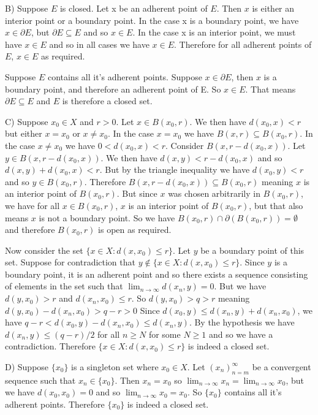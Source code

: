 \documentclass[12pt]{article}
\begin{document}
B) Suppose $E$ is closed. Let x be an adherent point of $E$. Then $x$ is either an interior point or a boundary point. In the case x is a boundary point, we have $x\in \partial E$, but $\partial E\subseteq E$ and so $x\in E$. In the case x is an interior point, we must have $x\in E$ and so in all cases we have $x\in E$. Therefore for all adherent points of $E$, $x\in E$ as required. 

Suppose $E$ contains all it's adherent points. Suppose $x\in \partial E$, then $x$ is a boundary point, and therefore an adherent point of E. So $x\in E$. That means $\partial E \subseteq E$ and $E$ is therefore a closed set.

C) Suppose $x_0\in X$ and $r>0$. Let $x \in B(x_0,r)$. We then have $d(x_0, x) <r$ but either $x=x_0$ or $x\neq x_0$. In the case $x= x_0$ we have $ B(x,r) \subseteq B(x_0,r)$. In the case $x\neq x_0$ we have $0<d(x_0,x)<r$. Consider $B(x, r-d(x_0,x))$. Let $y\in B(x, r-d(x_0,x))$. We then have $ d(x,y) <r-d(x_0,x)$ and so $d(x,y)+d(x_0,x) <r$. But by the triangle inequality we have $d(x_0,y) <r$ and so $y\in B(x_0,r)$. Therefore $ B(x, r-d(x_0,x))\subseteq B(x_0,r)$ meaning $x$ is an interior point of $B(x_0,r)$. But since $x$ was chosen arbitrarily in $ B(x_0,r)$, we have for all $x\in B(x_0,r) $, $x$ is an interior point of $B(x_0,r)$, but that also means $x$ is not a boundary point. So we have $B(x_0,r) \cap \partial(B(x_0,r)) = \emptyset$ and therefore $B(x_0,r)$ is open as required.

Now consider the set $\{x\in X: d(x,x_0)\leq r\}$. Let $y$ be a boundary point of this set. Suppose for contradiction that $y\notin \{x\in X: d(x,x_0)\leq r\}$. Since $y$ is a boundary point, it is an adherent point and so there exists a sequence consisting of elements in the set such that $\lim_{n\to\infty}d(x_n,y) = 0$. But we have $d(y,x_0)>r$ and $d(x_n,x_0) \leq r$. So $d(y,x_0) >q> r$ meaning $d(y,x_0) - d(x_n,x_0) >q-r > 0$ Since $d(x_0,y)\leq d(x_n,y) + d(x_n,x_0)$, we have $q-r<d(x_0,y)-d(x_n,x_0)\leq d(x_n,y)$. By the hypothesis we have $d(x_n,y) \leq (q-r)/2$ for all $n\geq N$ for some $N\geq 1$ and so we have a contradiction. Therefore $\{x\in X: d(x,x_0)\leq r\}$ is indeed a closed set.

D) Suppose $\{x_0\}$ is a singleton set where $x_0\in X$. Let $(x_n)_{n=m}^\infty$ be a convergent sequence such that $x_n\in \{x_0\} $. Then $x_n = x_0$ so $\lim_{n\to\infty}x_n= \lim_{n\to\infty}x_0$, but we have $d(x_0,x_0) = 0$ and so $\lim_{n\to\infty}x_0 = x_0$. So $\{x_0\}$ contains all it's adherent points. Therefore $\{x_0\}$ is indeed a closed set.
\end{document}
